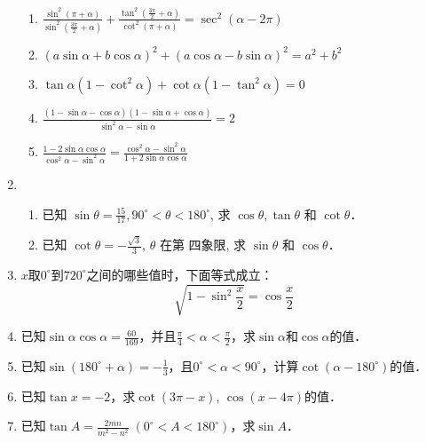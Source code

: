 \begin{enumerate}
\begin{enumerate}
\item $\frac{\sin ^{2}(\pi+\alpha)}{\sin ^{2}\left(\frac{3 \pi}{2}+\alpha\right)}+\frac{\tan^{2}\left(\frac{3 \pi}{2}+\alpha\right)}{\cot^{2}(\pi+\alpha)} =\sec ^{2}(\alpha-2 \pi)$
\item $(a \sin \alpha+b \cos \alpha)^{2}+(a \cos \alpha-b \sin \alpha)^{2}=a^{2}+b^{2}$
\item $\tan \alpha\left(1-\cot^{2} \alpha\right)+\cot \alpha\left(1-\tan^{2} \alpha\right)=0$
\item $\frac{(1-\sin \alpha-\cos \alpha)(1-\sin \alpha+\cos \alpha)}{\sin ^{2} \alpha-\sin \alpha}=2$
\item $\frac{1-2 \sin \alpha \cos \alpha}{\cos ^{2} \alpha-\sin ^{2} \alpha}=\frac{\cos ^{2} \alpha-\sin ^{2} \alpha}{1+2 \sin \alpha \cos \alpha}$
\end{enumerate}

\item \begin{enumerate}
    \item 已知 $\sin \theta=\frac{15}{17}, 90^{\circ}<\theta<180^{\circ}$,
求 $\cos \theta, \tan \theta$ 和 $\cot \theta$．

\item 已知 $\cot \theta=-\frac{\sqrt{3}}{3}$, $\theta$ 在第 四象限, 求 $\sin \theta$ 和 $\cos \theta$．
\end{enumerate} 

\item $x$取$0^{\circ}$到$720^{\circ}$之间的哪些值时，下面等式成立：
\[\sqrt{1-\sin^2\frac{x}{2}}=\cos\frac{x}{2}\]

\item 已知$\sin\alpha\cos\alpha=\frac{60}{169}$，并且$\frac{\pi}{4}<\alpha<\frac{\pi}{2}$，求$\sin\alpha$和$\cos\alpha$的值．

\item 已知$\sin(180^{\circ}+\alpha)=-\frac{1}{3}$，且$0^{\circ}<\alpha<90^{\circ}$，计算$\cot(\alpha-180^{\circ})$的值．
\item 已知$\tan x=-2$，求$\cot(3\pi-x)$, $\cos(x-4\pi)$的值．
\item 已知$\tan A=\frac{2mn}{m^2-n^2}\; (0^{\circ}<A<180^{\circ})$，求$\sin A$．
\end{enumerate}